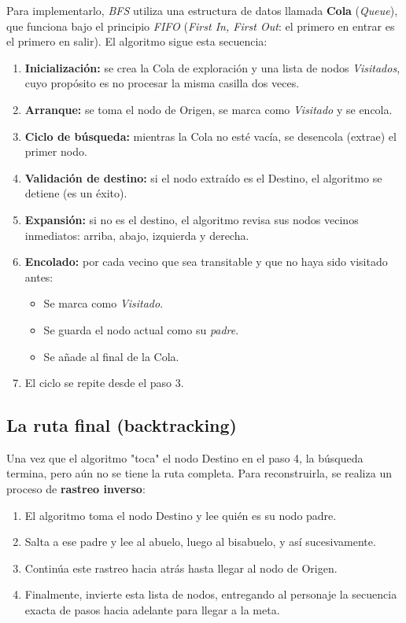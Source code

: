 \documentclass[12pt,letterpaper]{article}
\begin{document}
Para implementarlo, \textit{BFS} utiliza una estructura de datos llamada \textbf{Cola} (\textit{Queue}), que funciona bajo el principio \textit{FIFO} (\textit{First In, First Out}: el primero en entrar es el primero en salir). El algoritmo sigue esta secuencia:

\begin{enumerate}
  \item \textbf{Inicialización:} se crea la Cola de exploración y una lista de nodos \textit{Visitados}, cuyo propósito es no procesar la misma casilla dos veces.
  \item \textbf{Arranque:} se toma el nodo de Origen, se marca como \textit{Visitado} y se encola.
  \item \textbf{Ciclo de búsqueda:} mientras la Cola no esté vacía, se desencola (extrae) el primer nodo.
  \item \textbf{Validación de destino:} si el nodo extraído es el Destino, el algoritmo se detiene (es un éxito).
  \item \textbf{Expansión:} si no es el destino, el algoritmo revisa sus nodos vecinos inmediatos: arriba, abajo, izquierda y derecha.
  \item \textbf{Encolado:} por cada vecino que sea transitable y que no haya sido visitado antes:
  \begin{itemize}
    \item Se marca como \textit{Visitado}.
    \item Se guarda el nodo actual como su \textit{padre}.
    \item Se añade al final de la Cola.
  \end{itemize}
  \item El ciclo se repite desde el paso 3.
\end{enumerate}

\subsection{La ruta final (backtracking)}

Una vez que el algoritmo "toca" el nodo Destino en el paso 4, la búsqueda termina, pero aún no se tiene la ruta completa. Para reconstruirla, se realiza un proceso de \textbf{rastreo inverso}:

\begin{enumerate}
  \item El algoritmo toma el nodo Destino y lee quién es su nodo padre.
  \item Salta a ese padre y lee al abuelo, luego al bisabuelo, y así sucesivamente.
  \item Continúa este rastreo hacia atrás hasta llegar al nodo de Origen.
  \item Finalmente, invierte esta lista de nodos, entregando al personaje la secuencia exacta de pasos hacia adelante para llegar a la meta.
\end{enumerate}
\end{document}
